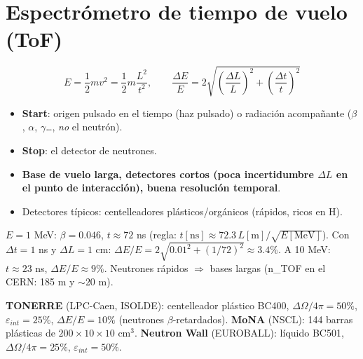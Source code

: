 \section{Espectrómetro de tiempo de vuelo (ToF)}
\begin{clave}[ToF]
\[ E=\frac12mv^2=\frac12m\frac{L^2}{t^2},\qquad \frac{\Delta E}{E}=2\sqrt{\left(\frac{\Delta L}{L}\right)^2+\left(\frac{\Delta t}{t}\right)^2} \]
\begin{itemize}
\item \textbf{Start}: origen pulsado en el tiempo (haz pulsado) o radiación acompañante ($\beta$, $\alpha$, $\gamma$\dots, \emph{no} el neutrón).
\item \textbf{Stop}: el detector de neutrones.
\item \textbf{Base de vuelo larga, detectores cortos (poca incertidumbre $\Delta L$ en el punto de interacción), buena resolución temporal}.
\item Detectores típicos: centelleadores plásticos/orgánicos (rápidos, ricos en H).
\end{itemize}
\end{clave}
\begin{ejemplo}[$L=1$ m]
$E=1$ MeV: $\beta=0.046$, $t\approx72$ ns (regla: $t[\mathrm{ns}]\approx72.3\,L[\mathrm{m}]/\sqrt{E[\mathrm{MeV}]}$).
Con $\Delta t=1$ ns y $\Delta L=1$ cm: $\Delta E/E=2\sqrt{0.01^2+(1/72)^2}\approx3.4\%$. A 10 MeV: $t\approx23$ ns, $\Delta E/E\approx9\%$.
Neutrones rápidos $\Rightarrow$ bases largas (n\_TOF en el CERN: 185 m y $\sim$20 m).
\end{ejemplo}
\begin{dato}[Instrumentos]
\textbf{TONERRE} (LPC-Caen, ISOLDE): centelleador plástico BC400, $\Delta\Omega/4\pi=50\%$, $\varepsilon_{int}=25\%$, $\Delta E/E=10\%$ (neutrones $\beta$-retardados).
\textbf{MoNA} (NSCL): 144 barras plásticas de $200\times10\times10$ cm$^3$. \textbf{Neutron Wall} (EUROBALL): líquido BC501, $\Delta\Omega/4\pi=25\%$, $\varepsilon_{int}=50\%$.
\end{dato}

